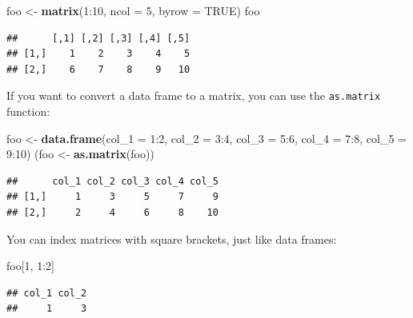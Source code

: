 \documentclass[]{book}
\makeatletter
\newenvironment{Shaded}{\begin{snugshade}}{\end{snugshade}}
\newcommand{\KeywordTok}[1]{\textcolor[rgb]{0.13,0.29,0.53}{\textbf{{#1}}}}
\newcommand{\DataTypeTok}[1]{\textcolor[rgb]{0.13,0.29,0.53}{{#1}}}
\newcommand{\DecValTok}[1]{\textcolor[rgb]{0.00,0.00,0.81}{{#1}}}
\newcommand{\StringTok}[1]{\textcolor[rgb]{0.31,0.60,0.02}{{#1}}}
\newcommand{\OtherTok}[1]{\textcolor[rgb]{0.56,0.35,0.01}{{#1}}}
\newcommand{\NormalTok}[1]{{#1}}
\newenvironment{kframe}{%
\medskip{}
\setlength{\fboxsep}{.8em}
 \def\at@end@of@kframe{}%
 \ifinner\ifhmode%
  \def\at@end@of@kframe{\end{minipage}}%
  \begin{minipage}{\columnwidth}%
 \fi\fi%
 \def\FrameCommand##1{\hskip\@totalleftmargin \hskip-\fboxsep
 \colorbox{shadecolor}{##1}\hskip-\fboxsep
     \hskip-\linewidth \hskip-\@totalleftmargin \hskip\columnwidth}%
 \MakeFramed {\advance\hsize-\width
   \@totalleftmargin\z@ \linewidth\hsize
   \@setminipage}}%
 {\par\unskip\endMakeFramed%
 \at@end@of@kframe}
\renewenvironment{Shaded}{\begin{kframe}}{\end{kframe}}
\makeatother
\begin{document}
\begin{Shaded}
\begin{Highlighting}[]
\NormalTok{foo <-}\StringTok{ }\KeywordTok{matrix}\NormalTok{(}\DecValTok{1}\NormalTok{:}\DecValTok{10}\NormalTok{, }\DataTypeTok{ncol =} \DecValTok{5}\NormalTok{, }\DataTypeTok{byrow =} \OtherTok{TRUE}\NormalTok{)}
\NormalTok{foo}
\end{Highlighting}
\end{Shaded}

\begin{verbatim}
##      [,1] [,2] [,3] [,4] [,5]
## [1,]    1    2    3    4    5
## [2,]    6    7    8    9   10
\end{verbatim}

If you want to convert a data frame to a matrix, you can use the
\texttt{as.matrix} function:

\begin{Shaded}
\begin{Highlighting}[]
\NormalTok{foo <-}\StringTok{ }\KeywordTok{data.frame}\NormalTok{(}\DataTypeTok{col_1 =} \DecValTok{1}\NormalTok{:}\DecValTok{2}\NormalTok{, }\DataTypeTok{col_2 =} \DecValTok{3}\NormalTok{:}\DecValTok{4}\NormalTok{,}
                  \DataTypeTok{col_3 =} \DecValTok{5}\NormalTok{:}\DecValTok{6}\NormalTok{, }\DataTypeTok{col_4 =} \DecValTok{7}\NormalTok{:}\DecValTok{8}\NormalTok{,}
                  \DataTypeTok{col_5 =} \DecValTok{9}\NormalTok{:}\DecValTok{10}\NormalTok{)}
\NormalTok{(foo <-}\StringTok{ }\KeywordTok{as.matrix}\NormalTok{(foo))}
\end{Highlighting}
\end{Shaded}

\begin{verbatim}
##      col_1 col_2 col_3 col_4 col_5
## [1,]     1     3     5     7     9
## [2,]     2     4     6     8    10
\end{verbatim}

You can index matrices with square brackets, just like data frames:

\begin{Shaded}
\begin{Highlighting}[]
\NormalTok{foo[}\DecValTok{1}\NormalTok{, }\DecValTok{1}\NormalTok{:}\DecValTok{2}\NormalTok{]}
\end{Highlighting}
\end{Shaded}

\begin{verbatim}
## col_1 col_2 
##     1     3
\end{verbatim}
\end{document}
